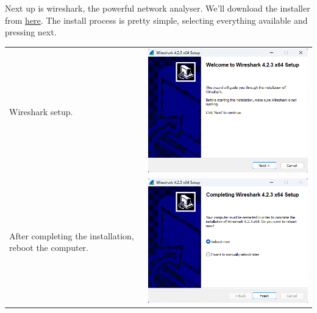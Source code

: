 \documentclass[11pt,a4paper]{report}
\begin{document}
        Next up is wireshark, the powerful network analyser.
        We'll download the installer from \href{https://www.wireshark.org/download.html}{here}.
        The install process is pretty simple, selecting everything available and pressing next.
        \begin{tabular}{ l r }
            Wireshark setup.                                        & \includegraphics[scale=0.3]{install_wireshark02} \\
            After completing the installation, reboot the computer. & \includegraphics[scale=0.3]{install_wireshark21} \\
        \end{tabular}
\end{document}
